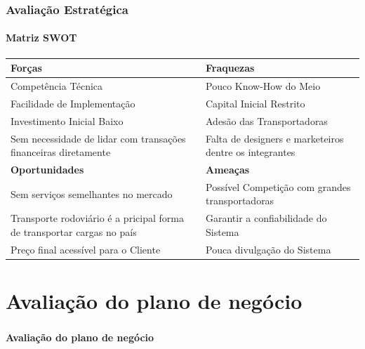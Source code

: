 \documentclass{beamer}
\begin{document}
\begin{frame}
  \frametitle{Avaliação Estratégica}
  \framesubtitle{Matriz SWOT}
  \begin{tabular}{|p{5.0cm}|p{5.0cm}|}
  \hline
   \textbf{Forças} & \textbf{Fraquezas}\\ \hline
    Competência Técnica & Pouco Know-How do Meio \\ \hline
   Facilidade de Implementação & Capital Inicial Restrito \\ \hline
   Investimento Inicial Baixo & Adesão das Transportadoras\\ \hline
   Sem necessidade de lidar com transações financeiras diretamente &  Falta de designers e marketeiros dentre os integrantes \\ \hline
    \textbf{Oportunidades} & \textbf{Ameaças}\\ \hline
Sem serviços semelhantes no mercado & Possível Competição com grandes transportadoras\\ \hline
Transporte rodoviário é a pricipal  forma de transportar cargas no país & Garantir a confiabilidade do Sistema \\   \hline
   Preço final acessível para o Cliente & Pouca divulgação do Sistema\\ \hline
  \end{tabular}
\end{frame}
\section{Avaliação do plano de negócio}
\begin{frame}
  \frametitle{}
  \framesubtitle{}

  \begin{center}
    {\huge\textbf{Avaliação do plano de negócio}}
  \end{center}
\end{frame}
\end{document}
